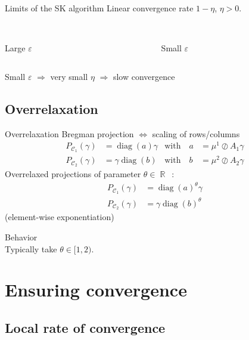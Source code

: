 \documentclass[compress]{beamer}
\DeclareMathOperator{\IR}{\mathbb{R}}
\DeclareMathOperator{\Ccal}{\mathcal{C}}
\DeclareMathOperator{\diag}{diag}
\renewcommand{\epsilon}{\varepsilon}
\begin{document}
\begin{frame}{Limits of the SK algorithm}
Linear convergence rate $1-\eta$, $\eta > 0$.

\begin{columns}
	\begin{column}{0.5\textwidth}
		\centering
		\\
		Large $\epsilon$
	\end{column}
	\begin{column}{0.5\textwidth}
		\centering
		\\
		Small $\epsilon$
	\end{column}
\end{columns}

Small $\epsilon$ $\Longrightarrow$
very small $\eta$ $\Longrightarrow$
slow convergence
\end{frame}

\subsection{Overrelaxation}
\begin{frame}{Overrelaxation}
Bregman projection $\Longleftrightarrow$ scaling of rows/columns
\begin{align}\label{scaling}
P_{\Ccal_1}(\gamma) &= \diag(a) \gamma &\text{with}\quad
a &=  {\mu^1}\oslash{A_1 \gamma} \\
P_{\Ccal_2}(\gamma) &= \gamma \diag(b) &\text{with}\quad
b &= {\mu^2}\oslash{A_2 \gamma}\nonumber
\end{align}
\pause
Overrelaxed projections of parameter $\theta \in \IR$~:
\begin{align}\label{or_scaling}
P_{\Ccal_1}(\gamma) &= \diag(a)^\theta \gamma\\
P_{\Ccal_2}(\gamma) &= \gamma \diag(b)^\theta \nonumber
\end{align}
(element-wise exponentiation)
\end{frame}

\begin{frame}{Behavior}
\centering
\\
Typically take $\theta \in [1,2)$.
\end{frame}

\section{Ensuring convergence}

\iffalse
\subsection[Local rate]{Local rate of convergence}
\end{document}
